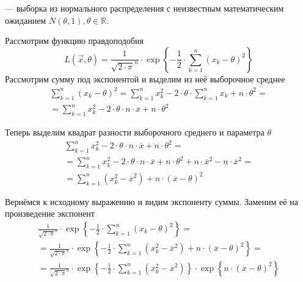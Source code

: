 \begin{example}
  \xsample --- выборка из нормального распределения с неизвестным
  математическим ожиданием $N\left( \theta, 1 \right), \theta \in \mathbb{R}$.

  Рассмотрим функцию правдоподобия
  \begin{equation*}
    L\left( \vec{x}, \theta \right)
    = \frac{1}{\sqrt{2 \cdot \pi}^n}
      \cdot \exp{\left\{ -\frac{1}{2}
      \cdot \sum_{k=1}^n \left( x_k - \theta \right)^2 \right\}}
  \end{equation*}
  Рассмотрим сумму под экспонентой и выделим из неё выборочное среднее
  \begin{align*}
      \sum_{k=1}^n \left( x_k - \theta \right)^2
      = \sum_{k=1}^n x_k^2 - 2 \cdot \theta \cdot \sum_{k=1}^n x_k
      + n \cdot \theta^2 = \\
      = \sum_{k=1}^n x_k^2 - 2 \cdot \theta \cdot n \cdot \overline{x}
      + n \cdot \theta^2
  \end{align*}

  Теперь выделим квадрат разности выборочного среднего и параметра $\theta$
  \begin{align*}
      \sum_{k=1}^n x_k^2 - 2 \cdot \theta \cdot n \cdot \overline{x}
      + n \cdot \theta^2 = \\
      = \sum_{k=1}^n x_k^2 - 2 \cdot \theta \cdot n \cdot \overline{x}
      + n \cdot \theta^2 + n \cdot \overline{x}^2
      - n \cdot \overline{x}^2 = \\
      = \sum_{k=1}^n \left( x_k^2 - \overline{x}^2 \right)
      + n \cdot \left( \overline{x} - \theta \right)^2
  \end{align*}

  Вернёмся к исходному выражению и видим экспоненту суммы.
  Заменим её на произведение экспонент
  \begin{align*}
      \frac{1}{\sqrt{2 \cdot \pi}^n} \cdot \exp{\left\{ -\frac{1}{2}
      \cdot \sum_{k=1}^n \left( x_k - \theta \right)^2 \right\}} = \\
      = \frac{1}{\sqrt{2 \cdot \pi}^n} \cdot \exp{\left\{ -\frac{1}{2}
      \cdot \sum_{k=1}^n \left( x_k^2 - \overline{x}^2 \right)
    + n \cdot \left( \overline{x} - \theta \right)^2
    \right\}} = \\
      = \frac{1}{\sqrt{2 \cdot \pi}^n}
      \cdot \exp{\left\{ -\frac{1}{2}
    \cdot \sum_{k=1}^n \left( x_k^2 - \overline{x}^2 \right)
        \right\}}
      \cdot \exp{\left\{ n \cdot \left( \overline{x}
    - \theta \right)^2 \right\}}
  \end{align*}


\end{example}
